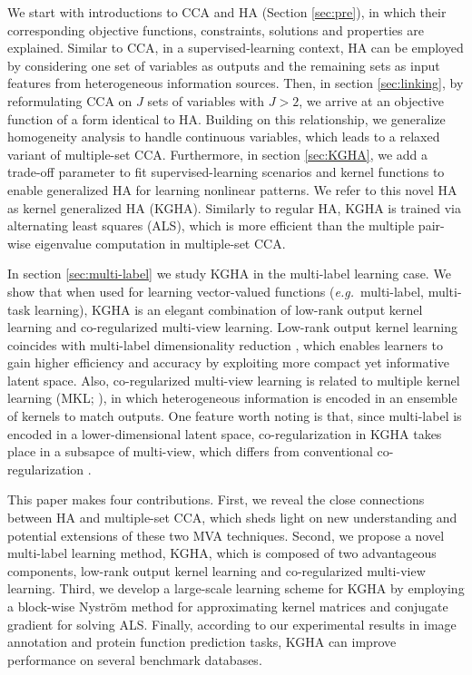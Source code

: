 \documentclass[a4paper]{article}
\begin{document}
We start with introductions to CCA and HA (Section \ref{sec:pre}), in which their corresponding objective 
functions, constraints, solutions and properties are explained. Similar to CCA, in a supervised-learning context, HA can be employed by considering one set of variables as 
outputs and the remaining sets as input 
features from heterogeneous information sources. 
Then, in section \ref{sec:linking}, by reformulating CCA on $J$ sets of variables with $J>2$, we 
arrive at an objective function of a form identical to HA.  Building on this relationship, we generalize homogeneity analysis to handle continuous 
variables, which leads to a relaxed variant of multiple-set CCA. Furthermore, in section \ref{sec:KGHA}, we add a trade-off parameter to fit supervised-learning scenarios and kernel functions to 
enable generalized HA for learning nonlinear patterns.  
We refer to this novel HA as kernel generalized HA (KGHA). Similarly to regular HA, KGHA is trained via alternating least squares (ALS), which is more efficient than the multiple pair-wise eigenvalue  
computation in multiple-set CCA. 

In section \ref{sec:multi-label} we study KGHA in the multi-label learning case.  We show that when used 
for learning vector-valued functions (\emph{e.g.}\ multi-label, multi-task learning), KGHA is an elegant combination of low-rank output kernel learning and co-regularized multi-view learning. 
Low-rank output kernel learning coincides with multi-label dimensionality reduction \cite{sun_MLDR}, which enables learners to gain higher efficiency and 
accuracy \cite{Ji_2009_IJCAI} by exploiting more compact yet informative latent space. Also, co-regularized multi-view learning  is related to multiple kernel learning 
(MKL; \citeauthor{MKL_cv} \citeyear{MKL_cv}), in which heterogeneous information is encoded in an ensemble of kernels to match outputs. One feature worth noting is that, 
since multi-label is encoded in a lower-dimensional latent space, co-regularization in KGHA takes place in a subsapce of multi-view, which differs from conventional 
co-regularization \cite{Rosenberg_2007_AISTATS}.                   

This paper makes four contributions. First, we reveal the close connections between HA and multiple-set CCA, which sheds light on new understanding   
and potential extensions of these two MVA techniques. 
Second, we propose a novel multi-label learning method, KGHA, which is composed of two advantageous components, low-rank output kernel 
learning and co-regularized multi-view learning. 
Third, we develop a large-scale learning scheme for KGHA by employing a block-wise Nystr{\"o}m method for approximating kernel matrices and conjugate gradient for solving ALS.           
Finally, according to our experimental results in image annotation and protein function prediction tasks, KGHA can improve performance on several benchmark databases.    
          
\end{document}
